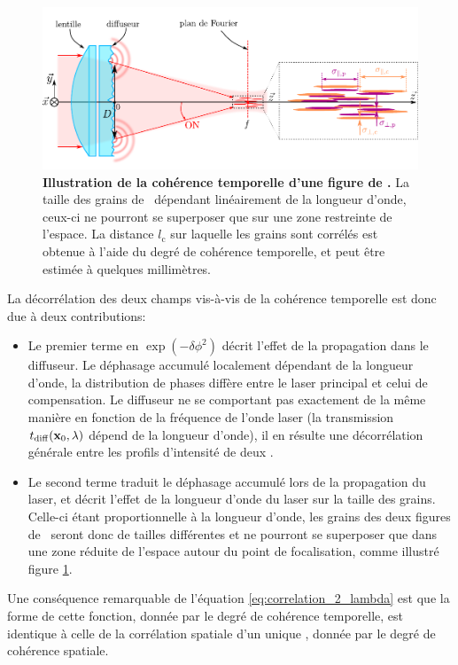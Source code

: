 \begin{figure}
\centering
\includegraphics[width=\textwidth]{Fig/Speckle/illustration_correlation_double_speckle.pdf}
\caption{\textbf{Illustration de la cohérence temporelle d'une figure de \speckle .} La taille des grains de \speckle\ dépendant linéairement de la longueur d'onde, ceux-ci ne pourront se superposer que sur une zone restreinte de l'espace. La distance $l_{\mathrm{c}}$ sur laquelle les grains sont corrélés est obtenue à l'aide du degré de cohérence temporelle, et peut être estimée à quelques millimètres.}
\label{fig:illustration_correlation_double_speckle}
\end{figure}

La décorrélation des deux champs vis-à-vis de la cohérence temporelle est donc due à deux contributions:
\begin{itemize}
\item[\textendash] Le premier terme en $\exp{(-\delta\phi^2)}$ décrit l'effet de la propagation dans le diffuseur. Le déphasage accumulé localement dépendant de la longueur d'onde, la distribution de phases diffère entre le laser principal et celui de compensation. Le diffuseur ne se comportant pas exactement de la même manière en fonction de la fréquence de l'onde laser (la transmission $t_{\mathrm{diff}}(\mathbf{x}_0,\lambda)$ dépend de la longueur d'onde), il en résulte une décorrélation générale entre les profils d'intensité de deux \speckles .
\item[\textendash] Le second terme traduit le déphasage accumulé lors de la propagation du laser, et décrit l'effet de la longueur d'onde du laser sur la taille des grains. Celle-ci étant proportionnelle à la longueur d'onde, les grains des deux figures de \speckle\ seront donc de tailles différentes et ne pourront se superposer que dans une zone réduite de l'espace autour du point de focalisation, comme illustré figure \ref{fig:illustration_correlation_double_speckle}.
\end{itemize}
Une conséquence remarquable de l'équation \ref{eq:correlation_2_lambda} est que la forme de cette fonction, donnée par le degré de cohérence temporelle, est identique à celle de la corrélation spatiale d'un unique \speckle , donnée par le degré de cohérence spatiale. 


